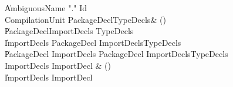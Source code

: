 \begin{bbgrammar}
    \| AmbiguousName \xcd"." Id\\
 CompilationUnit  \label{prod:CompilationUnit}  \: PackageDecl\opt TypeDecls\opt & ()\\
    \| PackageDecl\opt ImportDecls TypeDecls\opt\\
    \| ImportDecls PackageDecl  ImportDecls\opt  TypeDecls\opt\\
    \| PackageDecl ImportDecls PackageDecl  ImportDecls\opt  TypeDecls\opt\\
 ImportDecls  \label{prod:ImportDecls}  \: ImportDecl & ()\\
    \| ImportDecls ImportDecl\\
\end{bbgrammar}

